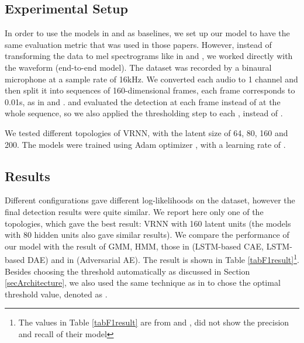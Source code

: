 \documentclass{article}
\begin{document}
\subsection{Experimental Setup}
\label{secExperimentalSetup}

In order to use the models in \cite{marchi_novel_2015} and \cite{principi_acoustic_2017} as baselines, we set up our model to have the same evaluation metric that was used in those papers. However, instead of transforming the data to mel spectrograms like in \cite{marchi_novel_2015} and \cite{principi_acoustic_2017}, we worked directly with the waveform (end-to-end model). The dataset was recorded by a binaural microphone at a sample rate of 16kHz. We converted each audio to 1 channel and then split it into sequences of 160-dimensional frames, each frame corresponds to 0.01s, as in \cite{marchi_novel_2015} and \cite{principi_acoustic_2017}. \cite{marchi_novel_2015} and \cite{principi_acoustic_2017} evaluated the detection at each frame instead of at the whole sequence, so we also applied the thresholding step to each , instead of . 

We tested different topologies of VRNN, with the latent size of 64, 80, 160 and 200.
The models were trained using Adam optimizer \cite{kingma_adam:_2015}, with a learning rate of . 


\subsection{Results}
\label{secResult}

Different configurations gave different log-likelihoods on the dataset, however the final detection results were quite similar. We report here only one of the topologies, which gave the best result: VRNN with 160 latent units (the models with 80 hidden units also gave similar results).
We compare the performance of our model with the result of GMM, HMM, those in \cite{marchi_novel_2015} (LSTM-based CAE, LSTM-based DAE) and in \cite{principi_acoustic_2017} (Adversarial AE). The result is shown in  Table \ref{tabF1result}\footnote{The values in Table \ref{tabF1result} are from \cite{marchi_novel_2015} and \cite{principi_acoustic_2017}, \cite{principi_acoustic_2017} did not show the precision and recall of their model}. Besides choosing the threshold automatically as discussed in Section \ref{secArchitecture}, we also used the same technique as in \cite{marchi_novel_2015} to chose the optimal threshold value, denoted as .
\end{document}
